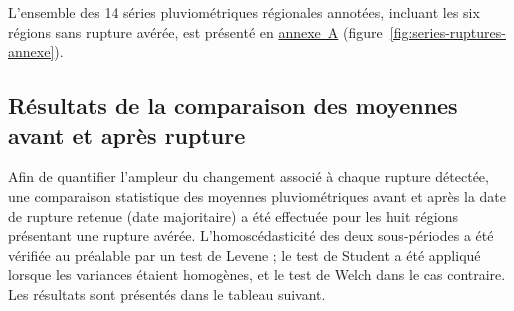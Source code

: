 \documentclass[12pt,a4paper]{report}
\begin{document}
L'ensemble des 14 séries pluviométriques régionales annotées, incluant les six régions sans rupture avérée, est présenté en \hyperref[ann:series-ruptures]{annexe~A} (figure~\ref{fig:series-ruptures-annexe}).

\subsection{Résultats de la comparaison des moyennes avant et après rupture}

Afin de quantifier l'ampleur du changement associé à chaque rupture détectée, une comparaison statistique des moyennes pluviométriques avant et après la date de rupture retenue (date majoritaire) a été effectuée pour les huit régions présentant une rupture avérée. L'homoscédasticité des deux sous-périodes a été vérifiée au préalable par un test de Levene ; le test de Student a été appliqué lorsque les variances étaient homogènes, et le test de Welch dans le cas contraire. Les résultats sont présentés dans le tableau suivant.
\end{document}
